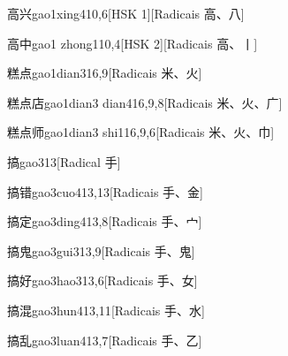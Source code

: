 \begin{entry}{高兴}{gao1xing4}{10,6}[HSK 1][Radicais ⾼、⼋]
\end{entry}

\begin{entry}{高中}{gao1 zhong1}{10,4}[HSK 2][Radicais ⾼、⼁]
\end{entry}

\begin{entry}{糕点}{gao1dian3}{16,9}[Radicais ⽶、⽕]
\end{entry}

\begin{entry}{糕点店}{gao1dian3 dian4}{16,9,8}[Radicais ⽶、⽕、⼴]
\end{entry}

\begin{entry}{糕点师}{gao1dian3 shi1}{16,9,6}[Radicais ⽶、⽕、⼱]
\end{entry}

\begin{entry}{搞}{gao3}{13}[Radical ⼿]
\end{entry}

\begin{entry}{搞错}{gao3cuo4}{13,13}[Radicais ⼿、⾦]
\end{entry}

\begin{entry}{搞定}{gao3ding4}{13,8}[Radicais ⼿、⼧]
\end{entry}

\begin{entry}{搞鬼}{gao3gui3}{13,9}[Radicais ⼿、⿁]
\end{entry}

\begin{entry}{搞好}{gao3hao3}{13,6}[Radicais ⼿、⼥]
\end{entry}

\begin{entry}{搞混}{gao3hun4}{13,11}[Radicais ⼿、⽔]
\end{entry}

\begin{entry}{搞乱}{gao3luan4}{13,7}[Radicais ⼿、⼄]
\end{entry}

